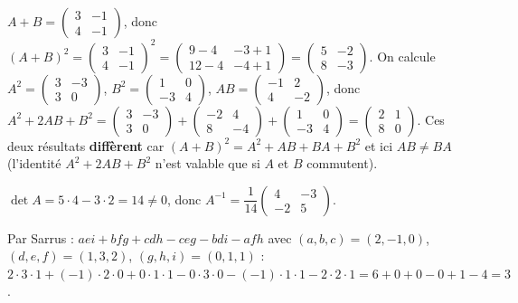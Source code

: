 $A+B=\begin{pmatrix}3&-1\\4&-1\end{pmatrix}$, donc
$(A+B)^2=\begin{pmatrix}3&-1\\4&-1\end{pmatrix}^2=\begin{pmatrix}9-4&-3+1\\12-4&-4+1\end{pmatrix}
=\begin{pmatrix}5&-2\\8&-3\end{pmatrix}$.
On calcule $A^2=\begin{pmatrix}3&-3\\3&0\end{pmatrix}$, $B^2=\begin{pmatrix}1&0\\-3&4\end{pmatrix}$,
$AB=\begin{pmatrix}-1&2\\4&-2\end{pmatrix}$, donc
$A^2+2AB+B^2=\begin{pmatrix}3&-3\\3&0\end{pmatrix}+\begin{pmatrix}-2&4\\8&-4\end{pmatrix}
+\begin{pmatrix}1&0\\-3&4\end{pmatrix}=\begin{pmatrix}2&1\\8&0\end{pmatrix}$.
Ces deux résultats \textbf{diffèrent} car $(A+B)^2=A^2+AB+BA+B^2$ et ici $AB\neq BA$
(l'identité $A^2+2AB+B^2$ n'est valable que si $A$ et $B$ commutent).

$\det A=5\cdot4-3\cdot2=14\neq0$, donc $A^{-1}=\dfrac1{14}\begin{pmatrix}4&-3\\-2&5\end{pmatrix}$.

Par Sarrus : $aei+bfg+cdh-ceg-bdi-afh$ avec
$(a,b,c)=(2,-1,0)$, $(d,e,f)=(1,3,2)$, $(g,h,i)=(0,1,1)$ :
$2\cdot3\cdot1+(-1)\cdot2\cdot0+0\cdot1\cdot1-0\cdot3\cdot0-(-1)\cdot1\cdot1-2\cdot2\cdot1
=6+0+0-0+1-4=3$.


